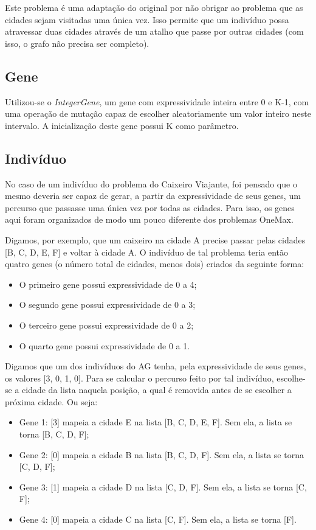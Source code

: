 Este problema é uma adaptação do original por não obrigar ao problema que as cidades sejam visitadas uma única vez. Isso permite que um indivíduo possa atravessar duas cidades através de um atalho que passe por outras cidades (com isso, o grafo não precisa ser completo).

\subsection*{Gene}

Utilizou-se o \emph{IntegerGene}, um gene com expressividade inteira entre 0 e K-1, com uma operação de mutação capaz de escolher aleatoriamente um valor inteiro neste intervalo. A inicialização deste gene possui K como parâmetro.

\subsection*{Indivíduo}

No caso de um indivíduo do problema do Caixeiro Viajante, foi pensado que o mesmo deveria ser capaz de gerar, a partir da expressividade de seus genes, um percurso que passasse uma única vez por todas as cidades. Para isso, os genes aqui foram organizados de modo um pouco diferente dos problemas OneMax.

Digamos, por exemplo, que um caixeiro na cidade A precise passar pelas cidades [B, C, D, E, F] e voltar à cidade A. O indivíduo de tal problema teria então quatro genes (o número total de cidades, menos dois) criados da seguinte forma:

\begin{itemize}
	\item O primeiro gene possui expressividade de 0 a 4;
	\item O segundo gene possui expressividade de 0 a 3;
	\item O terceiro gene possui expressividade de 0 a 2;
	\item O quarto gene possui expressividade de 0 a 1.
\end{itemize}

Digamos que um dos indivíduos do AG tenha, pela expressividade de seus genes, os valores [3, 0, 1, 0]. Para se calcular o percurso feito por tal indivíduo, escolhe-se a cidade da lista naquela posição, a qual é removida antes de se escolher a próxima cidade. Ou seja:

\begin{itemize}
	\item Gene 1: [3] mapeia a cidade E na lista [B, C, D, E, F]. Sem ela, a lista se torna [B, C, D, F];
	\item Gene 2: [0] mapeia a cidade B na lista [B, C, D, F]. Sem ela, a lista se torna [C, D, F];
	\item Gene 3: [1] mapeia a cidade D na lista [C, D, F]. Sem ela, a lista se torna [C, F];
	\item Gene 4: [0] mapeia a cidade C na lista [C, F]. Sem ela, a lista se torna [F].
\end{itemize}

